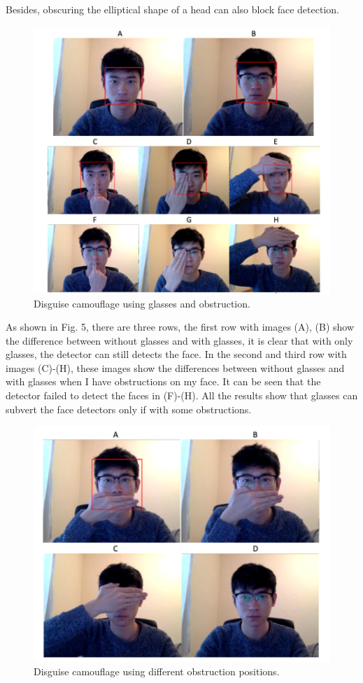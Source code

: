 \documentclass[conference]{IEEEtran}
\begin{document}
Besides, obscuring the elliptical shape of a head can also block face detection.

\begin{figure}
  \centerline{\includegraphics[scale=0.5]{./image/Disguise.png}}
  \caption{Disguise camouflage using glasses and obstruction. }
  \label{fig}
\end{figure}

As shown in Fig. 5, there are three rows, the first row with images (A), (B) show the difference between without glasses and with glasses, it is clear that with only glasses, the detector can still detects the face. In the second and third row with images (C)-(H), these images show the differences between without glasses and with glasses when I have obstructions on my face. It can be seen that the detector failed to detect the faces in (F)-(H). All the results show that glasses can subvert the face detectors only if with some obstructions.

\begin{figure}
  \centerline{\includegraphics[scale=0.5]{./image/Disguise2.png}}
  \caption{Disguise camouflage using different obstruction positions. }
  \label{fig}
\end{figure}
\end{document}
